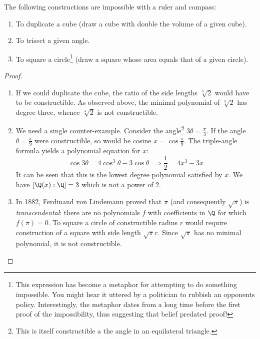 \begin{thm}
The following constructions are impossible with a ruler and compass:
\begin{enumerate}
  \item To duplicate a cube (draw a cube with double the volume of a 
given cube).
	\item To trisect a given angle.
	\item To square a circle\footnote{This expression has become a metaphor for attempting to do something impossible. You might hear it uttered by a politician to rubbish an opponents policy. Interestingly, the metaphor dates from a long time before the first proof of the impossibility, thus suggesting that belief predated proof!} (draw a square whose area equals that of a given circle). 
\end{enumerate}
\end{thm}

\begin{proof}
\begin{enumerate}
  \item If we could duplicate the cube, the ratio of the side lengths $\sqrt[3]{2}$ would have to be constructible. As observed above, the minimal polynomial of $\sqrt[3]{2}$ has degree three, whence $\sqrt[3]{2}$ is not constructible.
  \item We need a single counter-example. Consider the angle\footnote{This is itself constructible a the angle in an equilateral triangle.} $3\theta=\frac\pi 3$. If the angle $\theta=\frac\pi 9$ were constructible, so would be cosine $x=\cos\frac\pi 9$. The triple-angle formula yields a polynomial equation for $x$:
	\[\cos 3\theta=4\cos^3\theta-3\cos\theta\implies \frac 12=4x^3-3x\]
	It can be seen that this is the lowest degree polynomial satisfied by $x$. We have $[\Q(x):\Q]=3$ which is not a power of 2.
	\item In 1882, Ferdinand von Lindemann proved that $\pi$ (and consequently $\sqrt\pi$) is \emph{transcendental}: there are no polynomials $f$ with coefficients in $\Q$ for which $f(\pi)=0$. To square a circle of constructible radius $r$ would require construction of a square with side length $\sqrt\pi r$. Since $\sqrt\pi$ has no minimal polynomial, it is not constructible.\qedhere
\end{enumerate}
\end{proof}
